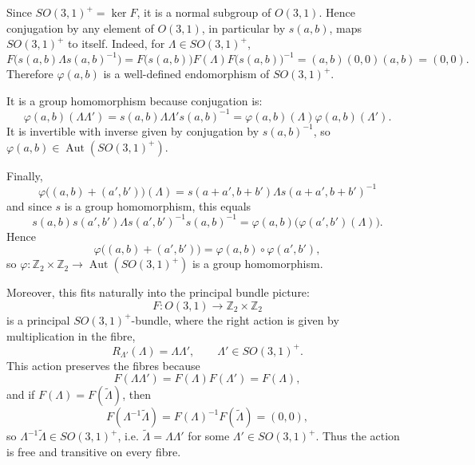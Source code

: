 \documentclass[a4paper,11pt,oneside]{article}
\begin{document}
{{            Since \(SO(3,1)^+ = \ker F\), it is a normal subgroup of \(O(3,1)\). Hence
            conjugation by any element of \(O(3,1)\), in particular by \(s(a,b)\),
            maps \(SO(3,1)^+\) to itself. Indeed, for \(\Lambda \in SO(3,1)^+\),
            \[
                F\bigl(s(a,b)\Lambda s(a,b)^{-1}\bigr)
                =
                F\bigl(s(a,b)\bigr)F(\Lambda)F\bigl(s(a,b)\bigr)^{-1}
                =
                (a,b)(0,0)(a,b)
                =
                (0,0).
            \]
            Therefore \(\varphi(a,b)\) is a well-defined endomorphism of
            \(SO(3,1)^+\).

            It is a group homomorphism because conjugation is:
            \[
                \varphi(a,b)(\Lambda\Lambda')
                =
                s(a,b)\Lambda\Lambda' s(a,b)^{-1}
                =
                \varphi(a,b)(\Lambda)\varphi(a,b)(\Lambda').
            \]
            It is invertible with inverse given by conjugation by \(s(a,b)^{-1}\),
            so \(\varphi(a,b) \in \operatorname{Aut}(SO(3,1)^+)\).

            Finally,
            \[
                \varphi\bigl((a,b)+(a',b')\bigr)(\Lambda)
                =
                s(a+a',b+b')\Lambda s(a+a',b+b')^{-1}
            \]
            and since \(s\) is a group homomorphism, this equals
            \[
                s(a,b)s(a',b')\Lambda s(a',b')^{-1}s(a,b)^{-1}
                =
                \varphi(a,b)\bigl(\varphi(a',b')(\Lambda)\bigr).
            \]
            Hence
            \[
                \varphi\bigl((a,b)+(a',b')\bigr)
                =
                \varphi(a,b)\circ \varphi(a',b'),
            \]
            so \(\varphi : \mathbb{Z}_2 \times \mathbb{Z}_2 \to
            \operatorname{Aut}(SO(3,1)^+)\) is a group homomorphism.

            Moreover, this fits naturally into the principal bundle picture:
            \[
                F : O(3,1) \to \mathbb{Z}_2 \times \mathbb{Z}_2
            \]
            is a principal \(SO(3,1)^+\)-bundle, where the right action is given by
            multiplication in the fibre,
            \[
                R_{\Lambda'}(\Lambda) = \Lambda\Lambda',
                \qquad \Lambda' \in SO(3,1)^+.
            \]
            This action preserves the fibres because
            \[
                F(\Lambda\Lambda') = F(\Lambda)F(\Lambda') = F(\Lambda),
            \]
            and if \(F(\Lambda)=F(\tilde{\Lambda})\), then
            \[
                F(\Lambda^{-1}\tilde{\Lambda}) = F(\Lambda)^{-1}F(\tilde{\Lambda}) = (0,0),
            \]
            so \(\Lambda^{-1}\tilde{\Lambda} \in SO(3,1)^+\), i.e.
            \(\tilde{\Lambda} = \Lambda\Lambda'\) for some
            \(\Lambda' \in SO(3,1)^+\). Thus the action is free and transitive on
            every fibre.

}}
\end{document}
